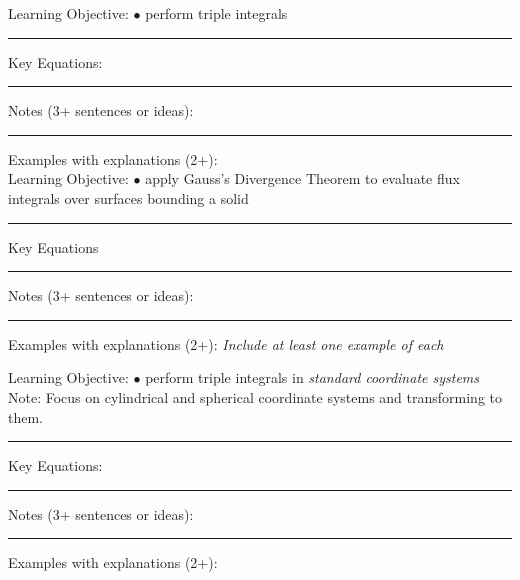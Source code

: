 \documentclass{article}
\theoremstyle{plain}
\theoremstyle{definition}
\theoremstyle{remark}
\begin{document}
\vskip-2pt
\noindent \large Learning Objective:
\normalsize
\vskip0.15in
$\bullet$ perform triple integrals\\
\vskip0.15in
\hrule
\vspace{0.1in}
\large \noindent Key Equations:
\normalsize

\vspace{1in}
\hrule
\vspace{0.1in}
\large \noindent Notes (3+ sentences or ideas):
\normalsize
\vspace{1.75in}
\hrule
\vspace{0.1in}

\large \noindent Examples with explanations (2+):\\


\newpage
\noindent \large Learning Objective:
\normalsize
\vskip0.15in
$\bullet$ apply Gauss's Divergence Theorem to evaluate flux integrals over surfaces bounding a solid
\vskip0.15in
\hrule
\vspace{0.1in}
\large \noindent Key Equations\\
\normalsize

\vspace{1in}
\hrule
\vspace{0.1in}
\large \noindent Notes (3+ sentences or ideas):
\normalsize
\vspace{1.75in}
\hrule
\vspace{0.1in}

\large \noindent Examples with explanations (2+):
\emph{Include at least one example of each}

\newpage
\noindent \large Learning Objective:
\normalsize
\vskip0.15in
$\bullet$ perform triple integrals in \emph{standard coordinate systems}\\
Note: Focus on cylindrical and spherical coordinate systems and transforming to them.
\vskip0.15in
\hrule
\vspace{0.1in}
\large \noindent Key Equations:
\normalsize

\vspace{1in}
\hrule
\vspace{0.1in}
\large \noindent Notes (3+ sentences or ideas):
\normalsize
\vspace{1.75in}
\hrule
\vspace{0.1in}

\large \noindent Examples with explanations (2+):\\
\normalsize

\newpage
\end{document}
